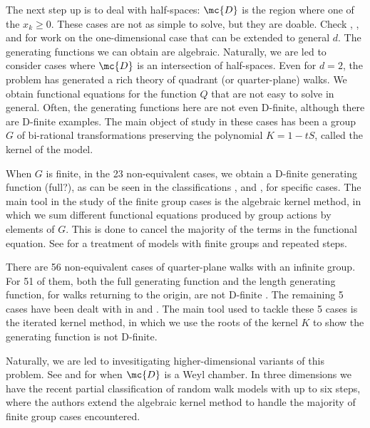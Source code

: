 The next step up is to deal with half-spaces: $\mc{D}$ is the region where one of the $x_k \ge 0$. These cases are not as simple to solve, but they are doable. Check \cite{gessel1980factorization}, \cite{bousquet2000linear}, \cite{duchon2000enumeration} and \cite{banderier2002basic} for work on the one-dimensional case that can be extended to general $d$. The generating functions we can obtain are algebraic. Naturally, we are led to consider cases where $\mc{D}$ is an intersection of half-spaces. Even for $d=2$, the problem has generated a rich theory of quadrant (or quarter-plane) walks. We obtain functional equations for the function $Q$ that are not easy to solve in general. Often, the generating functions here are not even D-finite, although there are D-finite examples. The main object of study in these cases has been a group $G$ of bi-rational transformations preserving the polynomial $K = 1- tS$, called the kernel of the model. 

When $G$ is finite, in the 23 non-equivalent cases, we obtain a D-finite generating function (full?), as can be seen in the classifications \cite{mishna2009classifying},\cite{bousquet2010walks} and \cite{bousquet2005walks}, \cite{bostan2010complete} for specific cases. The main tool in the study of the finite group cases is the algebraic kernel method, in which we sum different functional equations produced by group actions by elements of $G$. This is done to cancel the majority of the terms in the functional equation. See \cite{kauers2014walks} for a treatment of models with finite groups and repeated steps.

There are 56 non-equivalent cases of quarter-plane walks with an infinite group. For 51 of them, both the full generating function \cite{kurkova2011explicit} and the length generating function, for walks returning to the origin, are not D-finite \cite{bostan2014non}. The remaining 5 cases have been dealt with in \cite{melczer2014singularity} and \cite{melczer2014variants}. The main tool used to tackle these 5 cases is the iterated kernel method, in which we use the roots of the kernel $K$ to show the generating function is not D-finite.

Naturally, we are led to invesitigating higher-dimensional variants of this problem. See \cite{gessel1992random} and \cite{grabiner1993random} for when $\mc{D}$ is a Weyl chamber. In three dimensions we have the recent partial classification \cite{bostan2014three} of random walk models with up to six steps, where the authors extend the algebraic kernel method to handle the majority of finite group cases encountered.

